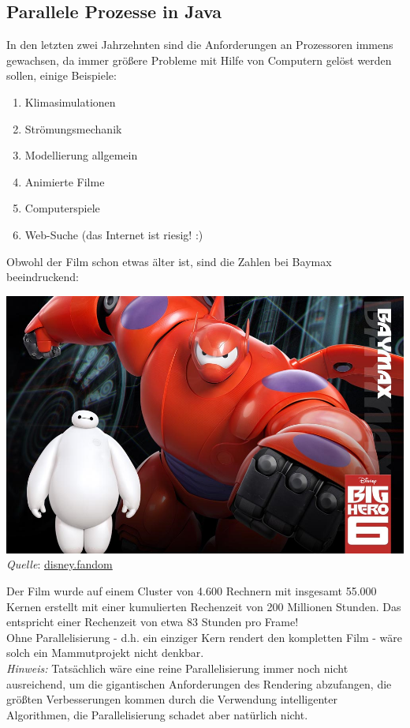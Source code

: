 \documentclass{article}
\begin{document}
\subsection{Parallele Prozesse in Java}

In den letzten zwei Jahrzehnten sind die Anforderungen an Prozessoren immens gewachsen, da immer größere Probleme mit Hilfe von Computern gelöst werden sollen, einige Beispiele:
\begin{enumerate}
    \item Klimasimulationen
    \item Strömungsmechanik
    \item Modellierung allgemein
    \item Animierte Filme
    \item Computerspiele
    \item Web-Suche (das Internet ist riesig! :)
\end{enumerate}
\newpage
Obwohl der Film schon etwas älter ist, sind die Zahlen bei Baymax beeindruckend:
\begin{center}
    \includegraphics[scale=1.1]{../media/baymax.png} \\
    \textit{Quelle}: \href{https://disney.fandom.com/wiki/Big_Hero_6/Gallery}{disney.fandom} 
\end{center}
Der Film wurde auf einem Cluster von 4.600 Rechnern mit insgesamt 55.000 Kernen erstellt mit einer kumulierten Rechenzeit von 200 Millionen Stunden. Das entspricht einer Rechenzeit von etwa 83 Stunden pro Frame! \\
Ohne Parallelisierung - d.h. ein einziger Kern rendert den kompletten Film - wäre solch ein Mammutprojekt nicht denkbar. \\
\textit{Hinweis:} Tatsächlich wäre eine reine Parallelisierung immer noch nicht ausreichend, um die gigantischen Anforderungen des Rendering abzufangen, die größten Verbesserungen kommen durch die Verwendung intelligenter Algorithmen, die Parallelisierung schadet aber natürlich nicht. \\
\end{document}
